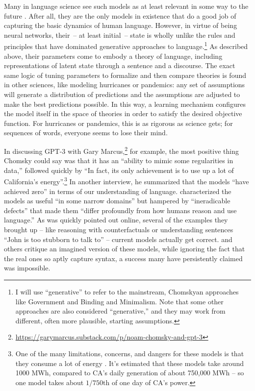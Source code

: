 \documentclass[output=paper,colorlinks,citecolor=brown
]{langscibook}
\begin{document}
Many in language science see such models as at least relevant in some way to the future \citep{bommasani2021opportunities,baroni2022proper,pater2019generative}. After all, they are the only  models in existence that do a good job of capturing the basic dynamics of human language. However, in virtue of being neural networks, their~-- at least initial~-- state is wholly unlike the rules and principles that have dominated generative approaches to language.\footnote{I will use ``generative'' to refer to the mainstream, Chomskyan approaches like Government and Binding and Minimalism. Note that some other approaches are also considered ``generative,'' and they may work from different, often more plausible, starting assumptions.} As described above, their parameters come to embody a theory of language, including representations of latent state through a sentence and a discourse. The exact same logic of tuning parameters to formalize and then compare theories is found in other sciences, like modeling hurricanes or pandemics: any set of assumptions will generate a distribution of predictions and the assumptions are adjusted to make the best predictions possible. In this way, a learning mechanism configures the model itself in the space of theories in order to satisfy the desired objective function. For hurricanes or pandemics, this is as rigorous as science gets; for sequences of words, everyone seems to lose their mind.

In discussing GPT-3 with Gary Marcus,\footnote{ \url{https://garymarcus.substack.com/p/noam-chomsky-and-gpt-3}} for example, the most positive thing Chomsky could say was that it has an ``ability to mimic some regularities in data,'' followed quickly by ``In fact, its only achievement is to use up a lot of California’s energy''.\footnote{ One of the many limitations, concerns, and dangers \citep{bender2021dangers,bommasani2021opportunities} for these models is that they consume a lot of energy \citep{strubell2019energy}. It's estimated that these models take around 1000 MWh, compared to CA's daily generation of about 750,000 MWh -- so one model takes about $1/750$th of one day of CA's power.} In another interview, he summarized that the models ``have achieved zero'' in terms of our understanding of language. \citet{chomsky2023false} characterized the models as useful ``in some narrow domains'' but hampered by ``ineradicable defects'' that made them ``differ profoundly from how humans reason and use language.'' As was quickly pointed out online, several of the examples they brought up -- like reasoning with counterfactuals or understanding sentences ``John is too stubborn to talk to'' -- current models actually get correct. \citet{chomsky2023false} and others critique an imagined version of these models, while ignoring the fact that the real ones so aptly capture syntax, a success many have persistently claimed was impossible.
\end{document}

